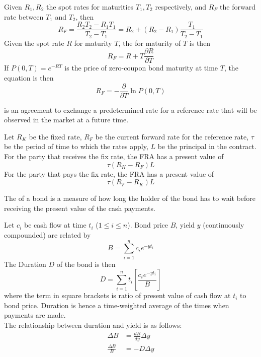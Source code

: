 {Given $R_1, R_2$ the spot rates for maturities $T_1, T_2$ respectively, and $R_F$ the forward rate between $T_1$ and $T_2$, then
\begin{equation}
R_F = \frac{R_2 T_2 - R_1 T_1}{T_2 - T_1}=R_2 + (R_2 - R_1)\frac{T_1}{T_2 - T_1} \nonumber
\end{equation}
Given the spot rate $R$ for maturity $T$, the  for maturity of $T$ is then
\begin{equation}
R_F = R + T \frac{\partial R}{\partial T} \nonumber
\end{equation}
If $P(0,T) = e^{-RT}$ is the price of zero-coupon bond maturity at time $T$, the equation is then
\begin{equation}
R_F = -\frac{\partial}{\partial T} \ln P(0,T) \nonumber
\end{equation}

\begin{definition}
 is an agreement to exchange a predetermined rate for a reference rate that will be observed in the market at a future time.
\end{definition}

Let $R_K$ be the fixed rate, $R_F$ be the current forward rate for the reference rate, $\tau$ be the period of time to which the rates apply, $L$ be the principal in the contract.\\
For the party that receives the fix rate, the FRA has a present value of 
\begin{equation}
\tau (R_K - R_F)L \nonumber
\end{equation}
For the party that pays the fix rate, the FRA has a present value of
\begin{equation}
\tau (R_F - R_K)L \nonumber
\end{equation}

\begin{definition}
The  of a bond is a measure of how long the holder of the bond has to wait before receiving the present value of the cash payments.
\end{definition}

Let $c_i$ be cash flow at time $t_i$ ($1 \leq i \leq n$). Bond price $B$, yield $y$ (continuously compounded) are related by
\begin{equation}
B = \sum\limits_{i=1}^n c_i e^{-y t_i} \nonumber
\end{equation}
The Duration $D$ of the bond is then
\begin{equation}
D = \sum\limits_{i=1}^n t_i \left[ \frac{c_i e^{-y t_i}}{B} \right] \nonumber
\end{equation}
where the term in square brackets is ratio of present value of cash flow at $t_i$ to bond price. Duration is hence a time-weighted average of the times when payments are made.\\
The relationship between duration and yield is as follows:
\begin{align}
\Delta B &= \frac{dB}{dy} \Delta y \nonumber \\
\frac{\Delta B}{B} &= - D \Delta y \nonumber
\end{align}

}
